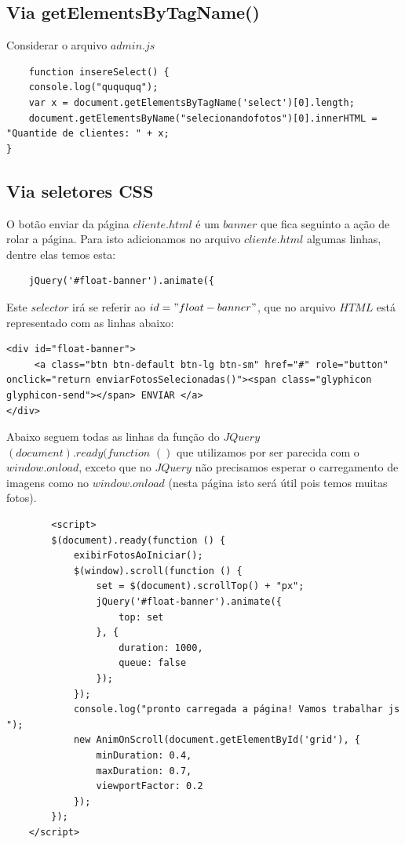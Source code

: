 \subsection{Via getElementsByTagName()}
	Considerar o arquivo $admin.js$
\begin{lstlisting}
	function insereSelect() {
    console.log("quququq");
    var x = document.getElementsByTagName('select')[0].length;
    document.getElementsByName("selecionandofotos")[0].innerHTML = "Quantide de clientes: " + x;
}
\end{lstlisting}


\subsection{Via seletores CSS}
	O botão enviar da página $cliente.html$ é um $banner$ que fica seguinto a ação de rolar a página. Para isto adicionamos no arquivo $cliente.html$ algumas linhas, dentre elas temos esta:
		\begin{lstlisting}	
	jQuery('#float-banner').animate({
		\end{lstlisting}
		Este $selector$ irá se referir ao $id="float-banner"$, que no arquivo $HTML$ está representado com as linhas abaixo:
\begin{lstlisting}
<div id="float-banner">
     <a class="btn btn-default btn-lg btn-sm" href="#" role="button" onclick="return enviarFotosSelecionadas()"><span class="glyphicon glyphicon-send"></span> ENVIAR </a>
</div>
\end{lstlisting}

	Abaixo seguem todas as linhas da função do $JQuery$ $(document).ready(function$ $()$ que utilizamos por ser parecida com o $window.onload$, exceto que no $JQuery$ não precisamos esperar o carregamento de imagens como no $window.onload$ (nesta página isto será útil pois temos muitas fotos).
	
		\begin{lstlisting}
	    <script>
        $(document).ready(function () {
            exibirFotosAoIniciar();
            $(window).scroll(function () {
                set = $(document).scrollTop() + "px";
                jQuery('#float-banner').animate({
                    top: set
                }, {
                    duration: 1000,
                    queue: false
                });
            });
            console.log("pronto carregada a página! Vamos trabalhar js ");
            new AnimOnScroll(document.getElementById('grid'), {
                minDuration: 0.4,
                maxDuration: 0.7,
                viewportFactor: 0.2
            });
        });
    </script>
	\end{lstlisting} 
  
